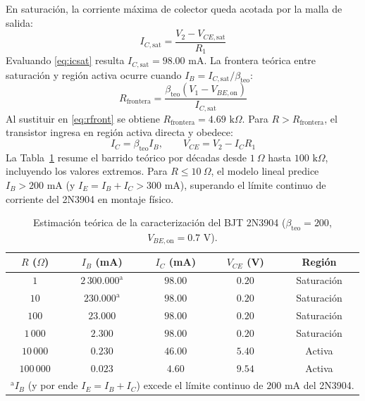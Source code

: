 \documentclass[conference]{IEEEtran}
\begin{document}
En saturaci\'on, la corriente m\'axima de colector queda acotada por la malla de salida:
\begin{equation}
I_{C,\mathrm{sat}} = \frac{V_2 - V_{CE,\mathrm{sat}}}{R_1}
\label{eq:icsat}
\end{equation}
Evaluando \eqref{eq:icsat} resulta $I_{C,\mathrm{sat}} = 98.00\text{ mA}$. La frontera te\'orica entre saturaci\'on y regi\'on activa ocurre cuando $I_B = I_{C,\mathrm{sat}}/\beta_{\mathrm{teo}}$:
\begin{equation}
R_{\mathrm{frontera}} = \frac{\beta_{\mathrm{teo}}(V_1 - V_{BE,\mathrm{on}})}{I_{C,\mathrm{sat}}}
\label{eq:rfront}
\end{equation}
Al sustituir en \eqref{eq:rfront} se obtiene $R_{\mathrm{frontera}} = 4.69\text{ k}\Omega$. Para $R > R_{\mathrm{frontera}}$, el transistor ingresa en regi\'on activa directa y obedece:
\begin{equation}
I_C = \beta_{\mathrm{teo}} I_B, \qquad V_{CE} = V_2 - I_C R_1
\label{eq:activa_caract}
\end{equation}
La Tabla~\ref{tab:caract_teo} resume el barrido te\'orico por d\'ecadas desde $1\ \Omega$ hasta $100\text{ k}\Omega$, incluyendo los valores extremos. Para $R \le 10\ \Omega$, el modelo lineal predice $I_B > 200\text{ mA}$ (y $I_E = I_B + I_C > 300\text{ mA}$), superando el l\'imite continuo de corriente del 2N3904 en montaje f\'isico.

\begin{table}[htbp]
\centering
\caption{Estimaci\'on te\'orica de la caracterizaci\'on del BJT 2N3904 ($\beta_{\mathrm{teo}} = 200$, $V_{BE,\mathrm{on}} = 0.7\text{ V}$).}
\label{tab:caract_teo}
\begin{tabular}{@{}ccccc@{}}
\toprule
$R$ ($\Omega$) & $I_B$ (mA) & $I_C$ (mA) & $V_{CE}$ (V) & Regi\'on \\
\midrule
$1$ & $2\,300.000^{\mathrm{a}}$ & $98.00$ & $0.20$ & Saturaci\'on \\
$10$ & $230.000^{\mathrm{a}}$ & $98.00$ & $0.20$ & Saturaci\'on \\
$100$ & $23.000$ & $98.00$ & $0.20$ & Saturaci\'on \\
$1\,000$ & $2.300$ & $98.00$ & $0.20$ & Saturaci\'on \\
$10\,000$ & $0.230$ & $46.00$ & $5.40$ & Activa \\
$100\,000$ & $0.023$ & $4.60$ & $9.54$ & Activa \\
\bottomrule
\multicolumn{5}{l}{\footnotesize $^{\mathrm{a}}$$I_B$ (y por ende $I_E = I_B + I_C$) excede el l\'imite continuo de $200\text{ mA}$ del 2N3904.}
\end{tabular}
\end{table}
\end{document}
